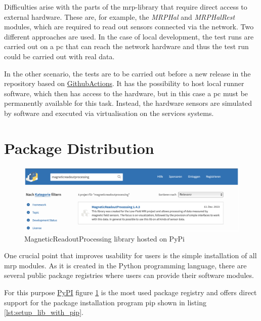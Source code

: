 Difficulties arise with the parts of the \gls{mrp}-library that require
direct access to external hardware. These are, for example, the
\emph{MRPHal} and \emph{MRPHalRest} modules, which are required to read
out sensors connected via the network. Two different approaches are
used. In the case of local development, the test runs are carried out on
a \gls{pc} that can reach the network hardware and thus the test run
could be carried out with real data.

In the other scenario, the tests are to be carried out before a new
release in the repository based on
\href{https://github.com/features/actions}{GithubActions}. It has the
possibility to host local runner software, which then has access to the
hardware, but in this case a \gls{pc} must be permanently available for
this task. Instead, the hardware sensors are simulated by software and
executed via virtualisation on the services systems.

\hypertarget{package-distribution}{%
\section{Package Distribution}\label{package-distribution}}

\begin{figure}
\centering
\includegraphics{./generated_images/border_MagneticReadoutProcessing_library_hosted_on_PyPi.png}
\caption{MagneticReadoutProcessing library hosted on PyPi
\label{MagneticReadoutProcessing_library_hosted_on_PyPi.png}}
\end{figure}

One crucial point that improves usability for users is the simple
installation of all \gls{mrp} modules. As it is created in the Python
programming language, there are several public package registries where
users can provide their software modules.

For this purpose \href{https://pypi.org}{PyPI} figure
\ref{MagneticReadoutProcessing_library_hosted_on_PyPi.png} is the most
used package registry and offers direct support for the package
installation program \gls{pip} shown in listing
\ref{lst:setup_lib_with_pip}.

